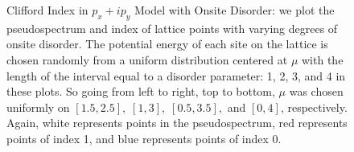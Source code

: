 \documentclass[a4paper]{article}
\begin{document}
\begin{figure}
\centering
{}%
%

%
%

\caption{Clifford Index in $p_x + ip_y$ Model with Onsite Disorder: we plot the pseudospectrum and index of lattice points with varying degrees of onsite disorder.
The potential energy of each site on the lattice is chosen randomly from a uniform distribution centered at $\mu$ with the length of the interval equal to a disorder parameter: 1, 2, 3, and 4 in these plots.
So going from left to right, top to bottom, $\mu$ was chosen uniformly on $[1.5,2.5],\; [1,3],\;[0.5,3.5],$ and $[0,4]$, respectively.
Again, white represents points in the pseudospectrum, red represents points of index 1, and blue represents points of index 0.
}%
\label{fig:mu_dis_index}%
\end{figure}
\end{document}
